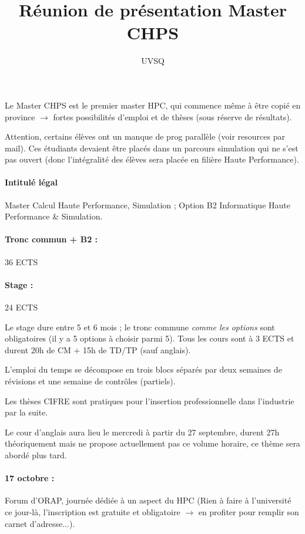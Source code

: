 \documentclass{article}
\title{Réunion de présentation Master CHPS}
\author{UVSQ}
\date{}
\begin{document}
\maketitle


Le Master CHPS est le premier master HPC, qui commence même à être copié en province $\to$ fortes possibilités d'emploi et de thèses (sous réserve de résultats).
\bigskip

Attention, certains élèves ont un manque de prog parallèle (voir resources par mail). Ces étudiants devaient être placés dans un parcours simulation qui ne s'est pas ouvert (donc l'intégralité des élèves sera placée en filière Haute Performance).

\paragraph{Intitulé légal} Master Calcul Haute Performance, Simulation ; Option B2 Informatique Haute Performance \& Simulation.
\bigskip

\paragraph{Tronc commun + B2 :} 36 ECTS
\paragraph{Stage :} 24 ECTS
\bigskip

Le stage dure entre 5 et 6 mois ; le tronc commune \emph{comme les options} sont obligatoires (il y a 5 options à choisir parmi 5). Tous les cours sont à 3 ECTS et durent 20h de CM + 15h de TD/TP (sauf anglais).

L'emploi du temps se décompose en trois blocs séparés par deux semaines de révisions et une semaine de contrôles (partiels).

Les thèses CIFRE sont pratiques pour l'insertion professionnelle dans l'industrie par la suite.

Le cour d'anglais aura lieu le mercredi à partir du 27 septembre, durent 27h théoriquement mais ne propose actuellement pas ce volume horaire, ce thème sera abordé plus tard.

\paragraph{17 octobre :} Forum d'ORAP, journée dédiée à un aspect du HPC (Rien à faire à l'université ce jour-là, l'inscription est gratuite et obligatoire $\to$ en profiter pour remplir son carnet d'adresse...).
\end{document}
